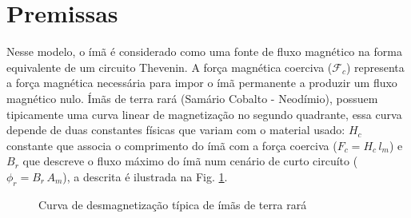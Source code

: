 
\section{Premissas}

Nesse modelo, o ímã é considerado como uma fonte de fluxo magnético na forma equivalente de um circuito Thevenin. A força magnética coerciva ($\mathcal{F}_c$) representa a força magnética necessária para impor o ímã permanente a produzir um fluxo magnético nulo. Ímãs de terra rará (Samário Cobalto - Neodímio), possuem tipicamente uma curva linear de magnetização no segundo quadrante, essa curva depende de duas constantes físicas que variam com o material usado: $H_c$ constante que associa o comprimento do ímã com a força coerciva ($ F_c = H_c \, l_m$) e $B_r$ que descreve o fluxo máximo do ímã num cenário de curto circuíto ($\phi_r = B_r \, A_m$), a descrita é ilustrada na Fig. \ref{Fig:Modelagem:circuito:passivo:ima}.

\begin{figure}[!ht]
	\centering
	\def\svgwidth{0.7\columnwidth}
	
	\caption{Curva de desmagnetização típica de ímãs de terra rará}
	\label{Fig:Modelagem:circuito:passivo:ima}
\end{figure}

